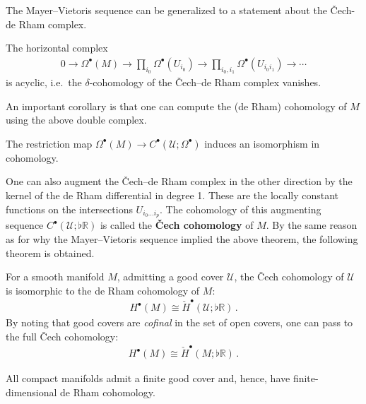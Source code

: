 
    The Mayer--Vietoris sequence can be generalized to a statement about the \v{C}ech-de Rham complex.
    \begin{property}
        The horizontal complex
        \begin{gather}
            0\longrightarrow\Omega^\bullet(M)\longrightarrow\prod_{i_0}\Omega^\bullet(U_{i_0})\longrightarrow\prod_{i_0,i_1}\Omega^\bullet(U_{i_0i_1})\longrightarrow\cdots
        \end{gather}
        is acyclic, i.e.~the $\delta$-cohomology of the \v{C}ech--de Rham complex vanishes.
    \end{property}

    An important corollary is that one can compute the (de Rham) cohomology of $M$ using the above double complex.
    \begin{property}
        The restriction map $\Omega^\bullet(M)\rightarrow C^\bullet(\mathcal{U};\Omega^\bullet)$ induces an isomorphism in cohomology.
    \end{property}
    One can also augment the \v{C}ech--de Rham complex in the other direction by the kernel of the de Rham differential in degree 1. These are the locally constant functions on the intersections $U_{i_0\ldots i_p}$. The cohomology of this augmenting sequence $C^\bullet(\mathcal{U};\flat\mathbb{R})$ is called the \textbf{\v{C}ech cohomology} of $M$. By the same reason as for why the Mayer--Vietoris sequence implied the above theorem, the following theorem is obtained.
    \begin{theorem}[\v{C}ech $=$ de Rham]
        For a smooth manifold $M$, admitting a good cover $\mathcal{U}$, the \v{C}ech cohomology of $\mathcal{U}$ is isomorphic to the de Rham cohomology of $M$:
        \begin{gather}
            H^\bullet(M)\cong\check{H}^\bullet(\mathcal{U};\flat\mathbb{R})\,.
        \end{gather}
        By noting that good covers are \textit{cofinal} in the set of open covers, one can pass to the full \v{C}ech cohomology:
        \begin{gather}
            H^\bullet(M)\cong\check{H}^\bullet(M;\flat\mathbb{R})\,.
        \end{gather}
    \end{theorem}
    \begin{result}
        All compact manifolds admit a finite good cover and, hence, have finite-dimensional de Rham cohomology.
    \end{result}


